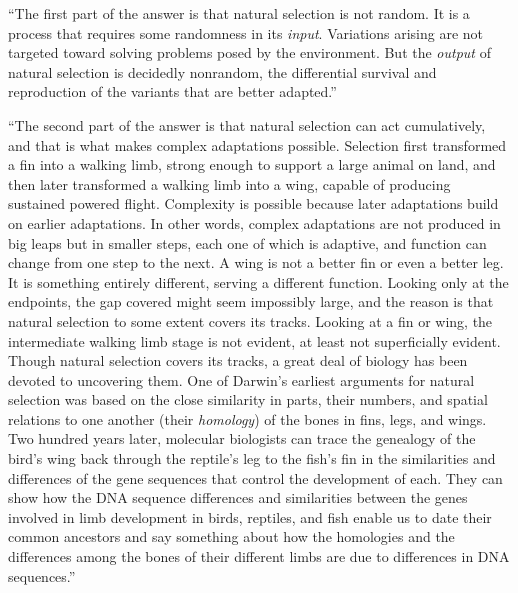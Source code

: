 \documentclass[
  11pt,
]{book}
\begin{document}
``The first part of the answer is that natural selection is not random. It is a process that requires some randomness in its \emph{input}. Variations arising are not targeted toward solving problems posed by the environment. But the \emph{output} of natural selection is decidedly nonrandom, the differential survival and reproduction of the variants that are better adapted.''

``The second part of the answer is that natural selection can act cumulatively, and that is what makes complex adaptations possible. Selection first transformed a fin into a walking limb, strong enough to support a large animal on land, and then later transformed a walking limb into a wing, capable of producing sustained powered flight. Complexity is possible because later adaptations build on earlier adaptations. In other words, complex adaptations are not produced in big leaps but in smaller steps, each one of which is adaptive, and function can change from one step to the next. A wing is not a better fin or even a better leg. It is something entirely different, serving a different function. Looking only at the endpoints, the gap covered might seem impossibly large, and the reason is that natural selection to some extent covers its tracks. Looking at a fin or wing, the intermediate walking limb stage is not evident, at least not superficially evident. Though natural selection covers its tracks, a great deal of biology has been devoted to uncovering them. One of Darwin's earliest arguments for natural selection was based on the close similarity in parts, their numbers, and spatial relations to one another (their \emph{homology}) of the bones in fins, legs, and wings. Two hundred years later, molecular biologists can trace the genealogy of the bird's wing back through the reptile's leg to the fish's fin in the similarities and differences of the gene sequences that control the development of each. They can show how the DNA sequence differences and similarities between the genes involved in limb development in birds, reptiles, and fish enable us to date their common ancestors and say something about how the homologies and the differences among the bones of their different limbs are due to differences in DNA sequences.''
\end{document}
